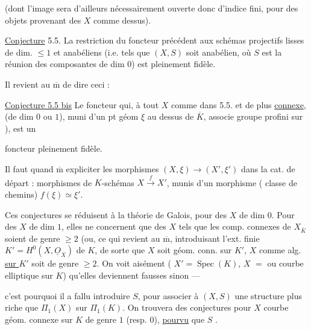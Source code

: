 (dont l'image sera d'ailleurs nécessairement ouverte donc
 d'indice fini, pour des objets provenant des $X$ comme dessus).

\uline{Conjecture} 5.5. La restriction du foncteur précédent
aux schémas projectifs lisses de dim. $\leq 1$ et anabéliens
(i.e. tels que $(X,S)$ soit anabélien, où $S$ est la réunion des
composantes de dim $0$) est pleinement fidèle.


Il revient au $\overline{\mathrm m}$ de dire ceci :


\uline{Conjecture 5.5 bis} Le foncteur qui, à tout $X$
 comme dans 5.5. et de plus \uline{connexe},
(de dim $0$ ou $1$), muni d'un pt géom $\xi$ au dessus de
$\overline K$, associe  groupe
profini  sur
), est un



foncteur pleinement fidèle.

Il faut quand $\overline{\mathrm m}$ expliciter les
morphismes $(X,\xi)\longrightarrow(X',\xi')$ dans la cat. de départ :
morphismes de $K$-schémas $X\xrightarrow{f}X'$, munis d'un morphisme
 ( classe de chemins)
 $f(\xi)\simeq\xi'$.

Ces conjectures se réduisent à la théorie de Galois, pour des $X$ de
 dim $0$. Pour des $X$ de dim $1$, elles ne concernent que des $X$ tels
que les comp. connexes de $X_{\overline K}$ soient de genre $\geq 2$
(ou, ce qui revient au $\overline{\mathrm m}$, introduisant
l'ext. finie $K'=H^0(X,\underline{O}_X)$ de $K$, de sorte que $X$ soit
géom. conn. sur $K'$,  $X$ comme
  alg.
\uline{sur $K'$} soit de genre $\geq 2$. On voit aisément
( $X'=\operatorname{Spec}(K)$,
$X$  $=$
 ou courbe elliptique sur $K$)
qu'elles deviennent fausses sinon ---



c'est pourquoi il a fallu introduire $S$,
pour associer à $(X,S)$ une structure plus riche que $\Pi_1(X)$ sur
$\Pi_1(K)$. On trouvera des conjectures 
pour $X$  courbe géom. connexe sur $K$ de genre
$1$ (resp. $0$),
\uline{pourvu} que $S$
.

